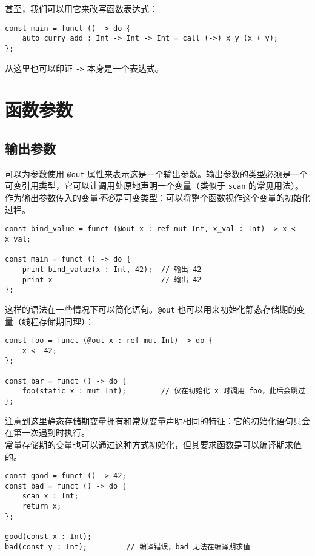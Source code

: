 甚至，我们可以用它来改写函数表达式：

\begin{minipage}[c]{0.95\textwidth}
\vspace{1.0em}
\begin{lstlisting}
const main = funct () -> do {
    auto curry_add : Int -> Int -> Int = call (->) x y (x + y);
};
\end{lstlisting}
\end{minipage}

从这里也可以印证 \lstinline!->! 本身是一个表达式。

\section{函数参数}

\subsection{输出参数}

可以为参数使用 \lstinline!@out! 属性来表示这是一个输出参数。输出参数的类型必须是一个可变引用类型，它可以让调用处原地声明一个变量（类似于 \lstinline!scan! 的常见用法）。作为输出参数传入的变量\emph{不必}是可变类型：可以将整个函数视作这个变量的初始化过程。

\begin{lstlisting}
const bind_value = funct (@out x : ref mut Int, x_val : Int) -> x <- x_val;

const main = funct () -> do {
	print bind_value(x : Int, 42);	// 输出 42
	print x							// 输出 42
};
\end{lstlisting}

这样的语法在一些情况下可以简化语句。\lstinline!@out! 也可以用来初始化静态存储期的变量（线程存储期同理）：

\begin{lstlisting}
const foo = funct (@out x : ref mut Int) -> do {
    x <- 42;
};

const bar = funct () -> do {
    foo(static x : mut Int);		// 仅在初始化 x 时调用 foo，此后会跳过
};
\end{lstlisting}

注意到这里静态存储期变量拥有和常规变量声明相同的特征：它的初始化语句只会在第一次遇到时执行。 \\

常量存储期的变量也可以通过这种方式初始化，但其要求函数是可以编译期求值的。

\begin{lstlisting}
const good = funct () -> 42;
const bad = funct () -> do {
    scan x : Int;
    return x;
};

good(const x : Int);
bad(const y : Int);			// 编译错误，bad 无法在编译期求值
\end{lstlisting}

